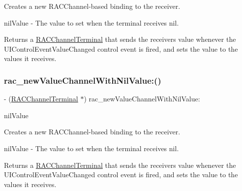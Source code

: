 Creates a new R\+A\+C\+Channel-\/based binding to the receiver.

nil\+Value -\/ The value to set when the terminal receives {\ttfamily nil}.

Returns a \mbox{\hyperlink{interface_r_a_c_channel_terminal}{R\+A\+C\+Channel\+Terminal}} that sends the receiver\textquotesingle{}s value whenever the U\+I\+Control\+Event\+Value\+Changed control event is fired, and sets the value to the values it receives. \mbox{\label{category_u_i_stepper_07_r_a_c_signal_support_08_a1fa058112e8d15cbabc5e408b8e4dd04}} 
\subsubsection{\texorpdfstring{rac\+\_\+new\+Value\+Channel\+With\+Nil\+Value\+:()}{rac\_newValueChannelWithNilValue:()}\hspace{0.1cm}{\footnotesize\ttfamily [2/3]}}
{\footnotesize\ttfamily -\/ (\mbox{\hyperlink{interface_r_a_c_channel_terminal}{R\+A\+C\+Channel\+Terminal}} $\ast$) rac\+\_\+new\+Value\+Channel\+With\+Nil\+Value\+: \begin{DoxyParamCaption}\item[{(N\+S\+Number $\ast$)}]{nil\+Value }\end{DoxyParamCaption}}

Creates a new R\+A\+C\+Channel-\/based binding to the receiver.

nil\+Value -\/ The value to set when the terminal receives {\ttfamily nil}.

Returns a \mbox{\hyperlink{interface_r_a_c_channel_terminal}{R\+A\+C\+Channel\+Terminal}} that sends the receiver\textquotesingle{}s value whenever the U\+I\+Control\+Event\+Value\+Changed control event is fired, and sets the value to the values it receives. \mbox{\label{category_u_i_stepper_07_r_a_c_signal_support_08_a1fa058112e8d15cbabc5e408b8e4dd04}} 
